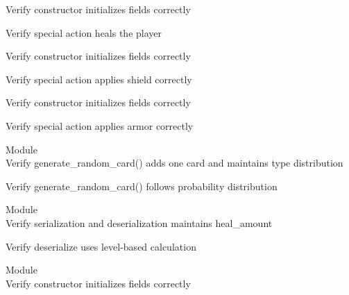 \begin{DoxyRefList}
\label{test__test000097}%
%
Verify  constructor initializes fields correctly  



\label{test__test000098}%
%
Verify  special action heals the player  



\label{test__test000099}%
%
Verify  constructor initializes fields correctly  



\label{test__test000100}%
%
Verify  special action applies shield correctly  



\label{test__test000101}%
%
Verify  constructor initializes fields correctly  



\label{test__test000102}%
%
Verify  special action applies armor correctly  


\item[Module \doxylink{group___hand}{Hand} ]\hfill \\
\label{test__test000066}%
%
Verify generate\+\_\+random\+\_\+card() adds one card and maintains type distribution  



\label{test__test000067}%
%
Verify generate\+\_\+random\+\_\+card() follows probability distribution  


\item[Module \doxylink{group___healer_character}{Healer\+Character} ]\hfill \\
\label{test__test000106}%
%
Verify serialization and deserialization maintains heal\+\_\+amount  



\label{test__test000107}%
%
Verify deserialize uses level-\/based calculation  


\item[Module \doxylink{group___heal_spell}{Heal\+Spell} ]\hfill \\
\label{test__test000013}%
%
Verify constructor initializes fields correctly  




\end{DoxyRefList}
